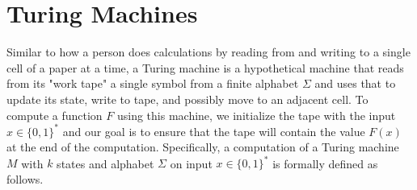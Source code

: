 \documentclass{article}
\begin{document}
\section{Turing Machines}

  Similar to how a person does calculations by reading from and writing to a single cell of a paper at a time, a Turing machine is a hypothetical machine that reads from its "work tape" a single symbol from a finite alphabet $\Sigma$ and uses that to update its state, write to tape, and possibly move to an adjacent cell. To compute a function $F$ using this machine, we initialize the tape with the input $x \in \{0,1\}^*$ and our goal is to ensure that the tape will contain the value $F(x)$ at the end of the computation. Specifically, a computation of a Turing machine $M$ with $k$ states and alphabet $\Sigma$ on input $x \in \{0,1\}^*$ is formally defined as follows. 
\end{document}
